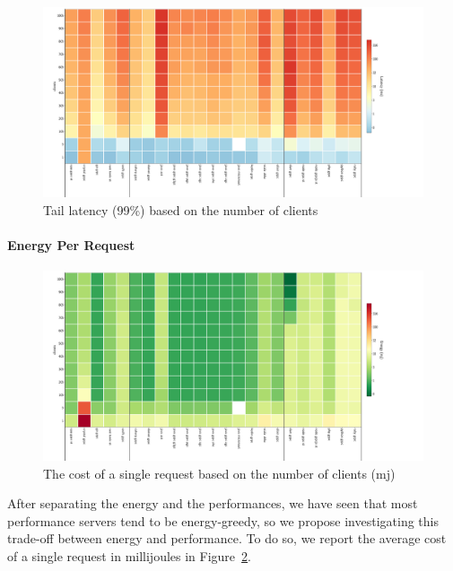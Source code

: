 \begin{figure}[!hbt]
    \begin{center}
        \includegraphics[width=1.2\linewidth]{imgs/tail99_clients}
    \end{center}
    \caption{Tail latency (99\%) based on the number of clients}\label{fig:tail99_clients}
\end{figure}



\paragraph{Energy Per Request}
\begin{figure}[!hbt]
    \begin{center}
        \includegraphics[width=1.2\linewidth]{imgs/energy_cost_clients}
    \end{center}
    \caption{The cost of a single request based on the number of clients (mj)}\label{fig:energy_cost_clients}
\end{figure}
After separating the energy and the performances, we have seen that most performance servers tend to be energy-greedy, so we propose investigating this trade-off between energy and performance.
To do so, we report the average cost of a single request in millijoules in Figure~\ref{fig:energy_cost_clients}.

